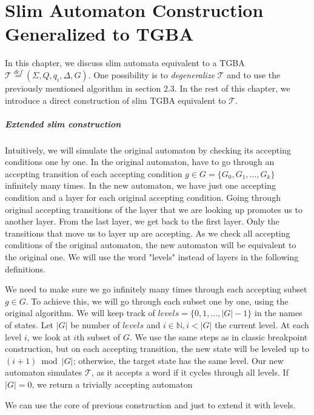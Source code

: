 \documentclass[
	digital,
nolof, nolot
]{fithesis3}
\newcommand{\cT}{\mathcal{T}}
\newcommand{\eqdef}{\overset{def}{=}}
\begin{document}
			
	\chapter{Slim Automaton Construction Generalized to TGBA} \label{section:gslim}
			In this chapter, we discuss slim automata equivalent to a TGBA $\cT\eqdef(\Sigma, Q, q_i, \Delta, G)$.
			One possibility is to \emph{degeneralize} $\cT$ and to use the previously mentioned algorithm in section 2.3.
			In the rest of this chapter, we introduce a direct construction of slim TGBA equivalent to $\cT$.
			\paragraph{Extended slim construction}
			Intuitively, we will simulate the original automaton by checking its accepting conditions one by one. In the original automaton, have to go through an accepting transition of each accepting condition $g \in G=\{G_0, G_1, \ldots, G_k\}$ infinitely many times.
			In the new automaton, we have just one accepting condition and a layer for each original accepting condition. Going through original accepting transitions of the layer that we are looking up promotes us to another layer. From the last layer, we get back to the first layer. Only the transitions that move us to layer up are accepting. As we check all accepting conditions of the original automaton, the new automaton will be equivalent to the original one. We will use the word "levels" instead of layers in the following definitions.
			
			
			We need to make sure we go infinitely many times through each accepting subset $g \in G$.
			To achieve this, we will go through each subset one by one, using the original algorithm. We will keep track of $levels=\{0,1,\ldots,|G|-1\}$ in the names of states. Let $|G|$ be number of $levels$ and $i \in \mathbb{N}, i<|G|$ the current level.
			At each level $i$, we look at $i$th subset of $G$. We use the same steps as in classic breakpoint construction, but on each accepting transition, the new state will be leveled up to $(i+1)\bmod|G|$;
			 otherwise, the target state has the same level. Our new automaton simulates $\cT$, as it accepts a word if it cycles through all levels. If $|G|=0$, we return a trivially accepting automaton
			
			We can use the core of previous construction and just to extend it with levels.
	
\end{document}
